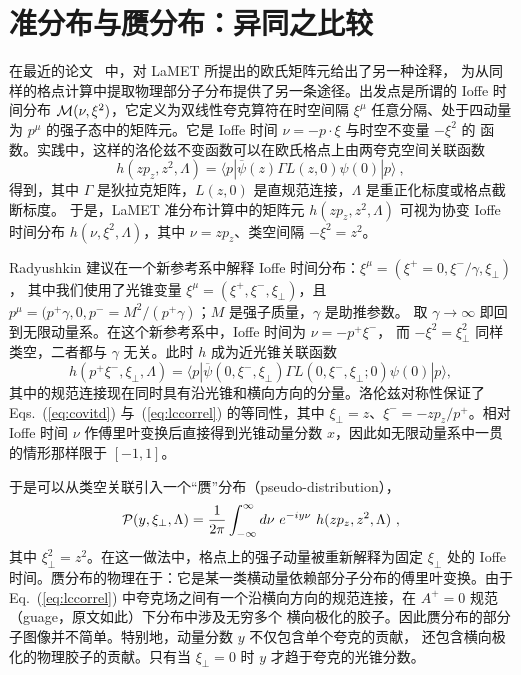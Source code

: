\section{准分布与赝分布：异同之比较}

在最近的论文~\cite{Radyushkin:2017cyf} 中，对 LaMET 所提出的欧氏矩阵元给出了另一种诠释，
为从同样的格点计算中提取物理部分子分布提供了另一条途径。出发点是所谓的 Ioffe 时间分布
${\cal M}(\nu,\xi^2)$，它定义为双线性夸克算符在时空间隔 $\xi^\mu$ 任意分隔、处于四动量为
$p^\mu$ 的强子态中的矩阵元。它是 Ioffe 时间 $\nu= -p\cdot \xi$ 与时空不变量 $-\xi^2$ 的
函数。实践中，这样的洛伦兹不变函数可以在欧氏格点上由两夸克空间关联函数
\begin{equation}\label{eq:covitd}
h(zp_z,z^2,\Lambda) =\langle p|\overline{\psi}(z)\Gamma L(z,0)\psi(0)|p\rangle \ ,
\end{equation}
得到，其中 $\Gamma$ 是狄拉克矩阵，$L(z,0)$ 是直规范连接，$\Lambda$ 是重正化标度或格点截断标度。
于是，LaMET 准分布计算中的矩阵元 $h(zp_z,z^2,\Lambda)$ 可视为协变 Ioffe 时间分布
$h(\nu,\xi^2,\Lambda)$，其中 $\nu = zp_z$、类空间隔 $-\xi^2 = z^2$。

Radyushkin 建议在一个新参考系中解释 Ioffe 时间分布：$\xi^\mu = (\xi^+=0, \xi^-/\gamma, \xi_\perp)$，
其中我们使用了光锥变量 $\xi^\mu = (\xi^+,\xi^-,\xi_\perp)$，且
$p^\mu = (p^+\gamma, 0, p^-=M^2/(p^+\gamma)$；$M$ 是强子质量，$\gamma$ 是助推参数。
取 $\gamma\rightarrow\infty$ 即回到无限动量系。在这个新参考系中，Ioffe 时间为 $\nu = -p^+\xi^-$，
而 $-\xi^2= \xi_\perp^2$ 同样类空，二者都与 $\gamma$ 无关。此时 $h$ 成为近光锥关联函数
\begin{equation}\label{eq:lccorrel}
h(p^+\xi^-, \xi_\perp, \Lambda) =\langle p|\overline{\psi}(0,\xi^-,\xi_\perp)\Gamma L(0,\xi^-,\xi_\perp;0)\psi(0)|p\rangle,
\end{equation}
其中的规范连接现在同时具有沿光锥和横向方向的分量。洛伦兹对称性保证了 Eqs.~(\ref{eq:covitd})
与~(\ref{eq:lccorrel}) 的等同性，其中 $\xi_\perp = z$、$\xi^- = -zp_z/p^+$。相对 Ioffe 时间
$\nu$ 作傅里叶变换后直接得到光锥动量分数 $x$，因此如无限动量系中一贯的情形那样限于 $[-1,1]$。

于是可以从类空关联引入一个``赝''分布（pseudo-distribution），
\begin{equation}
{\cal P}(y, \xi_\perp, \Lambda) = \frac{1}{2\pi} \int^\infty_{-\infty}d\nu\ e^{-iy\nu}\ h(zp_z,z^2, \Lambda)\ ,
\end{equation}
其中 $\xi_\perp^2 = z^2$。在这一做法中，格点上的强子动量被重新解释为固定 $\xi_\perp$ 处的
Ioffe 时间。赝分布的物理在于：它是某一类横动量依赖部分子分布的傅里叶变换。由于 Eq.~(\ref{eq:lccorrel})
中夸克场之间有一个沿横向方向的规范连接，在 $A^+=0$ 规范（guage，原文如此）下分布中涉及无穷多个
横向极化的胶子。因此赝分布的部分子图像并不简单。特别地，动量分数 $y$ 不仅包含单个夸克的贡献，
还包含横向极化的物理胶子的贡献。只有当 $\xi_\perp=0$ 时 $y$ 才趋于夸克的光锥分数。


